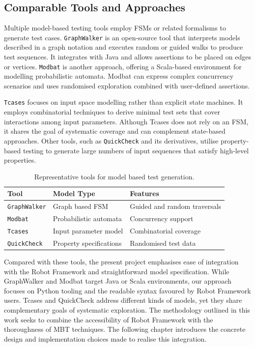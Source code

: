 \subsection{Comparable Tools and Approaches}
Multiple model-based testing tools employ FSMs or related formalisms to generate
test cases. \texttt{GraphWalker} is an open-source tool that interprets models described
in a graph notation and executes random or guided walks to produce test
sequences\cite{GraphWalker}. It integrates with Java and allows assertions to be
placed on edges or vertices. \texttt{Modbat} is another approach, offering a Scala-based
environment for modelling probabilistic automata\cite{Modbat}. Modbat can
express complex concurrency scenarios and uses randomised exploration combined
with user-defined assertions.

\texttt{Tcases} focuses on input space modelling rather than explicit state machines. It
employs combinatorial techniques to derive minimal test sets that cover
interactions among input parameters\cite{Tcases}. Although Tcases does not rely
on an FSM, it shares the goal of systematic coverage and can complement
state-based approaches. Other tools, such as \texttt{QuickCheck} and its derivatives,
utilise property-based testing to generate large numbers of input sequences that
satisfy high-level properties.

\begin{table}[ht]
  \centering
  \begin{tabular}{l l l}
    \toprule
    \textbf{Tool} & \textbf{Model Type} & \textbf{Features} \\
    \midrule
    \texttt{GraphWalker} & Graph based FSM & Guided and random traversals \\
    \texttt{Modbat} & Probabilistic automata & Concurrency support \\
    \texttt{Tcases} & Input parameter model & Combinatorial coverage \\
    \texttt{QuickCheck} & Property specifications & Randomised test data \\
    \bottomrule
  \end{tabular}
  \caption{Representative tools for model based test generation.}
  \label{tab:tool_comparison}
\end{table}

Compared with these tools, the present project emphasises ease of integration
with the Robot Framework and straightforward model specification. While
GraphWalker and Modbat target Java or Scala environments, our approach focuses
on Python tooling and the readable syntax favoured by Robot Framework
users. Tcases and QuickCheck address different kinds of models, yet they share
complementary goals of systematic exploration. The methodology outlined in this
work seeks to combine the accessibility of Robot Framework with the thoroughness
of MBT techniques. The following chapter introduces the concrete design and
implementation choices made to realise this integration.
